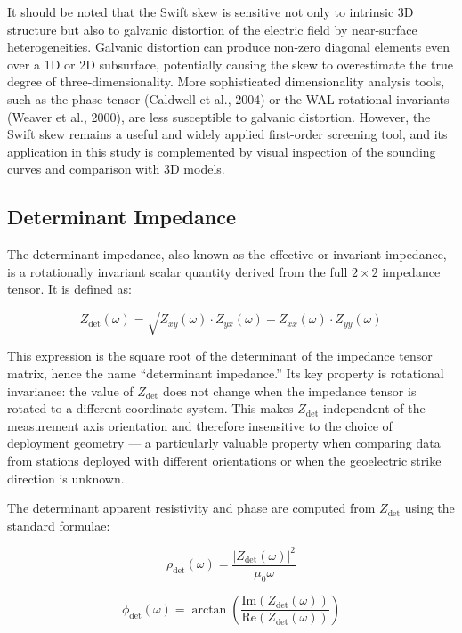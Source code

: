 It should be noted that the Swift skew is sensitive not only to intrinsic 3D structure but also to galvanic distortion of the electric field by near-surface heterogeneities. Galvanic distortion can produce non-zero diagonal elements even over a 1D or 2D subsurface, potentially causing the skew to overestimate the true degree of three-dimensionality. More sophisticated dimensionality analysis tools, such as the phase tensor (Caldwell et al., 2004) or the WAL rotational invariants (Weaver et al., 2000), are less susceptible to galvanic distortion. However, the Swift skew remains a useful and widely applied first-order screening tool, and its application in this study is complemented by visual inspection of the sounding curves and comparison with 3D models.

\subsection{Determinant Impedance}

The determinant impedance, also known as the effective or invariant impedance, is a rotationally invariant scalar quantity derived from the full $2 \times 2$ impedance tensor. It is defined as:

\begin{equation}
Z_{\text{det}}(\omega) = \sqrt{Z_{xy}(\omega) \cdot Z_{yx}(\omega) - Z_{xx}(\omega) \cdot Z_{yy}(\omega)}
\end{equation}

This expression is the square root of the determinant of the impedance tensor matrix, hence the name ``determinant impedance.'' Its key property is rotational invariance: the value of $Z_{\text{det}}$ does not change when the impedance tensor is rotated to a different coordinate system. This makes $Z_{\text{det}}$ independent of the measurement axis orientation and therefore insensitive to the choice of deployment geometry --- a particularly valuable property when comparing data from stations deployed with different orientations or when the geoelectric strike direction is unknown.

The determinant apparent resistivity and phase are computed from $Z_{\text{det}}$ using the standard formulae:

\begin{equation}
\rho_{\text{det}}(\omega) = \frac{|Z_{\text{det}}(\omega)|^2}{\mu_0 \omega}
\end{equation}

\begin{equation}
\phi_{\text{det}}(\omega) = \arctan\left(\frac{\text{Im}(Z_{\text{det}}(\omega))}{\text{Re}(Z_{\text{det}}(\omega))}\right)
\end{equation}

